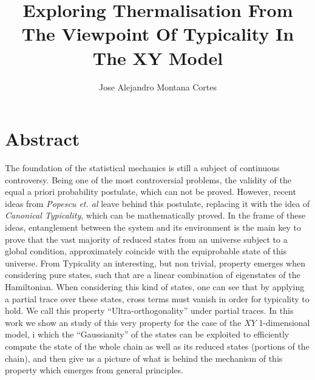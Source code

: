 \documentclass[12pt]{article}
\title{Exploring Thermalisation From The Viewpoint Of Typicality In The XY Model}
\author{Jose Alejandro Montana Cortes}
\begin{document}
\maketitle

\section*{Abstract}
The foundation of the statistical mechanics is still a subject of continuous controversy. Being one of the most controversial problems, the validity of the equal a priori probability postulate, which can not be proved. However, recent ideas from \textit{Popescu et. al}\cite{popescu_entanglement_2006} leave behind this postulate, replacing it with the idea of \textit{Canonical Typicality}, which can be mathematically proved. In the frame of these ideas, entanglement between the system and its environment is the main key to prove that the vast majority of reduced states from an universe subject to a global condition, approximately coincide with the equiprobable state of this universe.
\newline
From Typicality an interesting, but non trivial, property emerges when considering pure states, such that are a linear combination of eigenstates of the Hamiltonian. When considering this kind of states, one can see that by applying a partial trace over these states, cross terms must vanish in order for typicality to hold. We call this property ``Ultra-orthogonality'' under partial traces.
\newline
In this work we show an study of this very property for the case of the $XY$ 1-dimensional model, i which the ``Gaussianity'' of the states can be exploited to efficiently compute the state of the whole chain as well as its reduced states (portions of the chain), and then give us a picture of what is behind the mechanism of this property which emerges from general principles.

 

\end{document}
